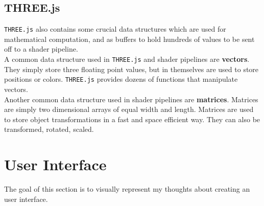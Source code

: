 \subsection{THREE.js}
\verb|THREE.js| also contains some crucial data structures which are used for mathematical computation, and as buffers to hold hundreds of values to be sent off to a shader pipeline. \\
A common data structure used in \verb|THREE.js| and shader pipelines are \textbf{vectors}. They simply store three floating point values, but in themselves are used to store positions or colors. \verb|THREE.js| provides dozens of functions that manipulate vectors. \\
Another common data structure used in shader pipelines are \textbf{matrices}. Matrices are simply two dimensional arrays of equal width and length. Matrices are used to store object transformations in a fast and space efficient way. They can also be transformed, rotated, scaled.

\newpage

\section{User Interface}
The goal of this section is to visually represent my thoughts about creating an user interface.
